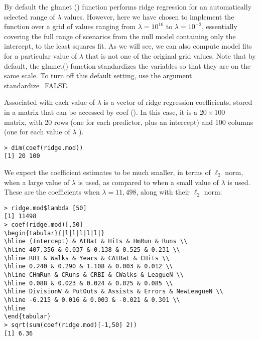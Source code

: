 \documentclass[10pt]{article}
\begin{document}
By default the glmnet () function performs ridge regression for an automatically selected range of $\lambda$ values. However, here we have chosen to implement the function over a grid of values ranging from $\lambda=10^{10}$ to $\lambda=10^{-2}$, essentially covering the full range of scenarios from the null model containing only the intercept, to the least squares fit. As we will see, we can also compute model fits for a particular value of $\lambda$ that is not one of the original grid values. Note that by default, the glmnet() function standardizes the variables so that they are on the same scale. To turn off this default setting, use the argument standardize=FALSE.

Associated with each value of $\lambda$ is a vector of ridge regression coefficients, stored in a matrix that can be accessed by coef (). In this case, it is a $20 
\times 100$\\
matrix, with 20 rows (one for each predictor, plus an intercept) and 100 columns (one for each value of $\lambda$ ).

\begin{verbatim}
> dim(coef(ridge.mod))
[1] 20 100
\end{verbatim}

We expect the coefficient estimates to be much smaller, in terms of $\ell_{2}$ norm, when a large value of $\lambda$ is used, as compared to when a small value of $\lambda$ is used. These are the coefficients when $\lambda=11,498$, along with their $\ell_{2}$ norm:

\begin{verbatim}
> ridge.mod$lambda [50]
[1] 11498
> coef(ridge.mod)[,50]
\begin{tabular}{|l|l|l|l|l|}
\hline (Intercept) & AtBat & Hits & HmRun & Runs \\
\hline 407.356 & 0.037 & 0.138 & 0.525 & 0.231 \\
\hline RBI & Walks & Years & CAtBat & CHits \\
\hline 0.240 & 0.290 & 1.108 & 0.003 & 0.012 \\
\hline CHmRun & CRuns & CRBI & CWalks & LeagueN \\
\hline 0.088 & 0.023 & 0.024 & 0.025 & 0.085 \\
\hline DivisionW & PutOuts & Assists & Errors & NewLeagueN \\
\hline -6.215 & 0.016 & 0.003 & -0.021 & 0.301 \\
\hline
\end{tabular}
> sqrt(sum(coef(ridge.mod)[-1,50] 2))
[1] 6.36
\end{verbatim}
\end{document}
